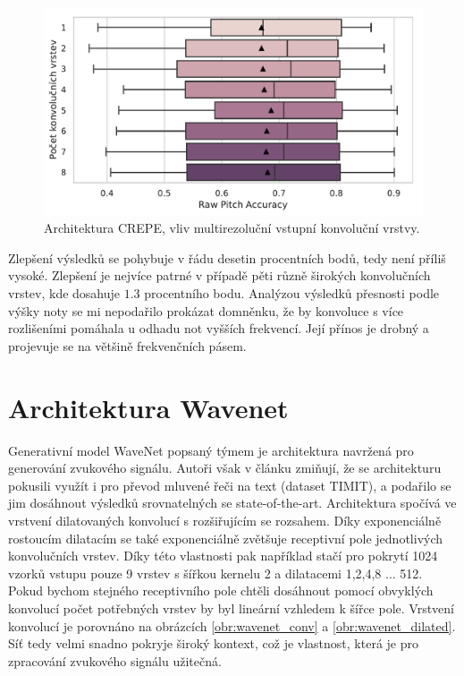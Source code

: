 \begin{figure}[h]\centering
    \includegraphics[scale=0.6]{../img/figures/crepe_multirozliseni.pdf}
\caption{Architektura CREPE, vliv multirezoluční vstupní konvoluční vrstvy.}\label{obr:crepe_multirozliseni}
\end{figure}

Zlepšení výsledků se pohybuje v řádu desetin procentních bodů, tedy není příliš vysoké. Zlepšení je nejvíce patrné v případě pěti různě širokých konvolučních vrstev, kde dosahuje $1.3$ procentního bodu. Analýzou výsledků přesnosti podle výšky noty se mi nepodařilo prokázat domněnku, že by konvoluce s více rozlišeními pomáhala u odhadu not vyšších frekvencí. Její přínos je drobný a projevuje se na většině frekvenčních pásem.


\section{Architektura Wavenet}

Generativní model WaveNet popsaný týmem \cite{Oord2016} je architektura navržená pro generování zvukového signálu. Autoři však v článku zmiňují, že se architekturu pokusili využít i pro převod mluvené řeči na text (dataset TIMIT), a podařilo se jim dosáhnout výsledků srovnatelných se state-of-the-art. Architektura spočívá ve vrstvení dilatovaných konvolucí s rozšiřujícím se rozsahem. Díky exponenciálně rostoucím dilatacím se také exponenciálně zvětšuje receptivní pole jednotlivých konvolučních vrstev. Díky této vlastnosti pak například stačí pro pokrytí 1024 vzorků vstupu pouze 9 vrstev s šířkou kernelu 2 a dilatacemi 1,2,4,8 ... 512. Pokud bychom stejného receptivního pole chtěli dosáhnout pomocí obvyklých konvolucí počet potřebných vrstev by byl lineární vzhledem k šířce pole. Vrstvení konvolucí je porovnáno na obrázcích \ref{obr:wavenet_conv} a \ref{obr:wavenet_dilated}. Síť tedy velmi snadno pokryje široký kontext, což je vlastnost, která je pro zpracování zvukového signálu užitečná.

